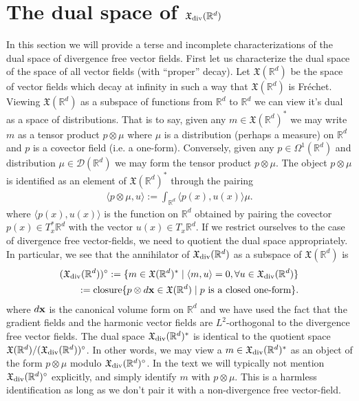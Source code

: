 \documentclass[12pt]{amsart}
\newcommand{\R}{\ensuremath{\mathbb{R}}}
\begin{document}
\section{The dual space of $\mathfrak{X}_{\rm div}(\R^d)$}
\label{sec:measure_valued_momap}
In this section we will provide a terse and incomplete
characterizations of the dual space of divergence free 
vector fields.  First let us characterize the dual space of the space of all vector fields (with ``proper'' decay).
Let $\mathfrak{X}(\R^d)$ be the space of vector fields which decay at infinity
in such a way that $\mathfrak{X}(\R^d)$ is Fr\'echet.
Viewing $\mathfrak{X}(\R^d)$ as a subspace of functions from $\R^d$ to $\R^d$
we can view it's dual as a space of distributions.
That is to say, given any $m \in \mathfrak{X}(\R^d)^*$ we may write $m$ as a tensor
product $p \otimes \mu$ where $\mu$ is a distribution (perhaps a measure)
on $\R^d$ and $p$ is a covector field (i.e. a one-form).
Conversely, given any $p \in \Omega^1(\R^d)$ and distribution $\mu \in \mathcal{D}(\R^d)$
we may form the tensor product $p \otimes \mu$.
The object $p\otimes \mu$ is identified as an element of $\mathfrak{X}(\R^d)^*$ through
the pairing
\begin{align*}
	\langle p \otimes \mu , u \rangle :=  \int_{\R^d} \langle p(x) , u(x) \rangle \mu.
\end{align*}
where $\langle p(x),u(x) \rangle$ is the function on $\R^d$ obtained by pairing the covector $p(x) \in T_x^*\R^d$ with the vector $u(x) \in T_x\R^d$.
If we restrict ourselves to the case of divergence free vector-fields, we need to quotient
the dual space appropriately.  In particular, we see that the annihilator of $\mathfrak{X}_{\rm div}(\R^d)$
as a subspace of $\mathfrak{X}(\R^d)$ is
\begin{align*}
	(\mathfrak{X}_{\rm div}(\R^d) )^\circ := \{ m \in \mathfrak{X}(\R^d)^* \mid \langle m , u \rangle = 0 , \forall u \in \mathfrak{X}_{\rm div}(\R^d) \}\\
		:= {\rm closure}\{ p \otimes d{\bf x} \in \mathfrak{X}(\R^d) \mid p \text{ is a closed one-form} \}.
\end{align*}
where $d{\bf x}$ is the canonical volume form on $\R^d$ and
we have used the fact that the gradient fields and the harmonic vector fields are $L^2$-orthogonal to the divergence free vector fields.
The dual space $\mathfrak{X}_{\rm div}(\R^d)^*$ is identical to the quotient space $\mathfrak{X}(\R^d) / (\mathfrak{X}_{\rm div}(\R^d))^\circ$.
In other words, we may view a $m \in \mathfrak{X}_{\rm div}(\R^d)^*$ as an object of the form $p \otimes \mu$ modulo $\mathfrak{X}_{\rm div}(\R^d)^\circ$.
In the text we will typically not mention $\mathfrak{X}_{\rm div}(\R^d)^\circ$ explicitly, and simply identify $m$ with $p \otimes \mu$.
This is a harmless identification as long as we don't pair it with a non-divergence free vector-field.
\end{document}
